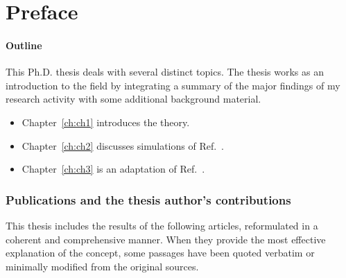 \documentclass[../main]{subfiles}
\begin{document}
\chapter{Preface}
\lipsum[1-10]


\newrefcontext[labelprefix=P]
\nocite{Doe_PRB_2021}
\nocite{Doe_npjFP_2022}
\nocite{Doe_2023}

\clearpage
\subsubsection{Outline}
This Ph.D. thesis deals with several distinct topics. The thesis works as an introduction to the field by integrating a summary of the major findings of my research activity with some additional background material.

\begin{itemize}
    \item Chapter~\ref{ch:ch1} introduces the theory.
    
    \item Chapter~\ref{ch:ch2} discusses simulations of Ref.~\cite{Doe_PRB_2021, Doe_npjFP_2022}.
    
    \item Chapter~\ref{ch:ch3} is an adaptation of Ref.~\cite{Doe_2023}. 
    
\end{itemize}

\subsection{Publications and the thesis author’s contributions}
This thesis includes the results of the following articles, reformulated in a coherent and comprehensive manner. When they provide the most effective explanation of the concept, some passages have been quoted verbatim or minimally modified from the original sources.
\end{document}
